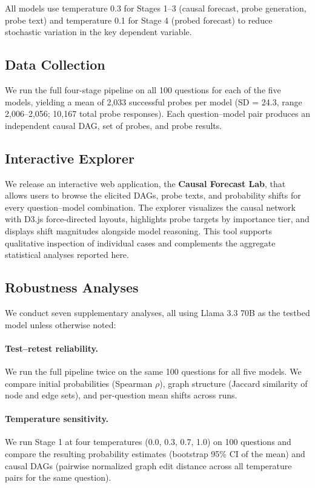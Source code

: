 \documentclass[11pt]{article}
\begin{document}
All models use temperature 0.3 for Stages 1--3 (causal forecast, probe generation, probe text) and temperature 0.1 for Stage 4 (probed forecast) to reduce stochastic variation in the key dependent variable.

\subsection{Data Collection}

We run the full four-stage pipeline on all 100 questions for each of the five models, yielding a mean of 2,033 successful probes per model (SD = 24.3, range 2,006--2,056; 10,167 total probe responses). Each question--model pair produces an independent causal DAG, set of probes, and probe results.

\subsection{Interactive Explorer}

We release an interactive web application, the \textbf{Causal Forecast Lab}, that allows users to browse the elicited DAGs, probe texts, and probability shifts for every question--model combination. The explorer visualizes the causal network with D3.js force-directed layouts, highlights probe targets by importance tier, and displays shift magnitudes alongside model reasoning. This tool supports qualitative inspection of individual cases and complements the aggregate statistical analyses reported here.

\subsection{Robustness Analyses}

We conduct seven supplementary analyses, all using Llama 3.3 70B as the testbed model unless otherwise noted:

\paragraph{Test--retest reliability.} We run the full pipeline twice on the same 100 questions for all five models. We compare initial probabilities (Spearman $\rho$), graph structure (Jaccard similarity of node and edge sets), and per-question mean shifts across runs.

\paragraph{Temperature sensitivity.} We run Stage 1 at four temperatures (0.0, 0.3, 0.7, 1.0) on 100 questions and compare the resulting probability estimates (bootstrap 95\% CI of the mean) and causal DAGs (pairwise normalized graph edit distance across all temperature pairs for the same question).
\end{document}
